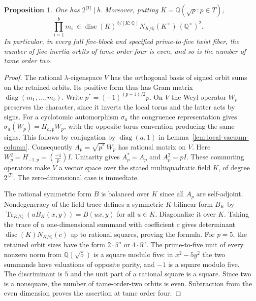 \documentclass[11pt,a4paper]{article}
\numberwithin{equation}{section}
\newtheorem{proposition}[theorem]{Proposition}
\theoremstyle{remark}
\newcommand{\QQ}{\mathbb Q}
\begin{document}
\begin{proposition}\label{found:J:7.1}\label{found:J:key:pr:qmult}
One has $2^{|T|}\mid b$. Moreover, putting $K=\QQ(\sqrt p:p\in T)$,
\[
 \prod_{i=1}^b m_i\ \in \operatorname{disc}(K)^{\,b/[K:\QQ]}\,
 N_{K/\QQ}(K^\times)\,(\QQ^\times)^2 .
\]
In particular, in every full five-block and specified prime-to-five
twist fiber, the number of five-inertia orbits of tame order four is
even, and so is the number of tame order two.
\end{proposition}
\begin{proof}
The rational $\lambda$-eigenspace $V$ has the orthogonal basis of
signed orbit sums on the retained orbits. Its positive form thus has
Gram matrix $\operatorname{diag}(m_1,\ldots,m_b)$. Write $p^*=
(-1)^{(p-1)/2}p$. On $V$ the Weyl operator $W_p$ preserves the
character, since it inverts the local torus and the latter acts by
signs. For a cyclotomic automorphism $\sigma_a$ the congruence
representation gives $\sigma_a(W_p)=H_{a,p}W_p$, with the opposite
torus convention producing the same signs. This follows by
conjugation by $\operatorname{diag}(a,1)$ in Lemma~\ref{lem:local-vacuum-column}.
Consequently $A_p=\sqrt{p^*}\,W_p$ has rational matrix on $V$.
Here $W_p^2=H_{-1,p}=(\frac{-1}{p})I$. Unitarity gives
$A_p^*=A_p$ and $A_p^2=pI$. These commuting operators make $V$ a
vector space over the stated multiquadratic field $K$, of degree
$2^{|T|}$. The zero-dimensional case is immediate.

The rational symmetric form $B$ is balanced over $K$ since all $A_p$
are self-adjoint. Nondegeneracy of the field trace defines a symmetric
$K$-bilinear form $B_K$ by
$\operatorname{Tr}_{K/\QQ}(uB_K(x,y))=B(ux,y)$ for all $u\in K$.
Diagonalize it over $K$. Taking the trace of a one-dimensional
summand with coefficient $c$ gives determinant
$\operatorname{disc}(K)N_{K/\QQ}(c)$ up to rational squares, proving
the formula. For $p=5$, the retained orbit sizes have the form
$2\cdot5^a$ or $4\cdot5^a$. The prime-to-five unit of every
nonzero norm from $\QQ(\sqrt5)$ is a square modulo five:
in $x^2-5y^2$ the two summands have valuations of opposite parity,
and $-1$ is a square modulo five. The discriminant is $5$ and the
unit part of a rational square is a square. Since two is a
nonsquare, the number of tame-order-two orbits is even. Subtraction
from the even dimension proves the assertion at tame order four.
\end{proof}
\end{document}
